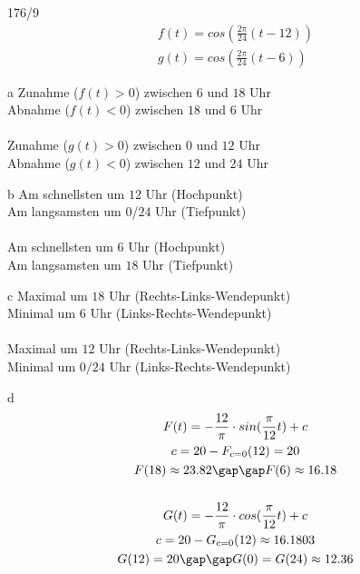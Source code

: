 \begin{exercise}{176/9}
  \begin{gather*}
    f(t) = cos(\frac{2\pi}{24}(t - 12)) \\
    g(t) = cos(\frac{2\pi}{24}(t - 6))
  \end{gather*}
  \item [a]
  Zunahme ($f(t) > 0$) zwischen $6$ und $18$ Uhr \\
  Abnahme ($f(t) < 0$) zwischen $18$ und $6$ Uhr \\\\
  Zunahme ($g(t) > 0$) zwischen $0$ und $12$ Uhr \\
  Abnahme ($g(t) < 0$) zwischen $12$ und $24$ Uhr
  \item [b]
  Am schnellsten um $12$ Uhr (Hochpunkt) \\
  Am langsamsten um $0$/$24$ Uhr (Tiefpunkt) \\\\
  Am schnellsten um $6$ Uhr (Hochpunkt) \\
  Am langsamsten um $18$ Uhr (Tiefpunkt)
  \item [c]
  Maximal um $18$ Uhr (Rechts-Links-Wendepunkt) \\
  Minimal um $6$ Uhr (Links-Rechts-Wendepunkt) \\\\
  Maximal um $12$ Uhr (Rechts-Links-Wendepunkt) \\
  Minimal um $0/24$ Uhr (Links-Rechts-Wendepunkt)
  \item [d]
  \begin{gather*}
    F(t) = -\frac{12}{\pi} \cdot sin(\frac{\pi}{12}t) + c \\
    c = 20 - F_{c=0}(12) = 20 \\
    F(18) \approx 23.82 \gap\gap F(6) \approx 16.18 \\\\
    G(t) = -\frac{12}{\pi} \cdot cos(\frac{\pi}{12}t) + c \\
    c = 20 - G_{c=0}(12) \approx 16.1803 \\
    G(12) = 20 \gap\gap G(0) = G(24) \approx 12.36
  \end{gather*}
\end{exercise}

